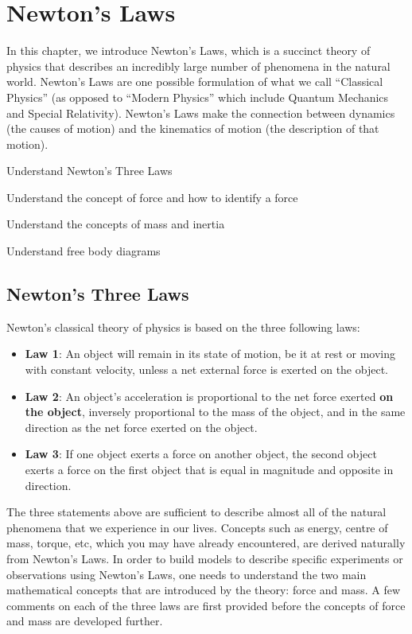 
\chapter{Newton's Laws}
In this chapter, we introduce Newton's Laws, which is a succinct theory of physics that describes an incredibly large number of phenomena in the natural world. Newton's Laws are one possible formulation of what we call ``Classical Physics'' (as opposed to ``Modern Physics'' which include Quantum Mechanics and Special Relativity). Newton's Laws make the connection between dynamics (the causes of motion) and the kinematics of motion (the description of that motion). 
\label{chap:NewtonsLaws}
 \vspace{1cm}
\begin{learningObjectives}
\item Understand Newton's Three Laws
\item Understand the concept of force and how to identify a force
\item Understand the concepts of mass and inertia
\item Understand free body diagrams
\end{learningObjectives}

\section{Newton's Three Laws}
Newton's classical theory of physics is based on the three following laws:
\begin{itemize}
\item \textbf{Law 1}: An object will remain in its state of motion, be it at rest or moving with constant velocity, unless a net external force is exerted on the object.
\item \textbf{Law 2}: An object's acceleration is proportional to the net force exerted \textbf{on the object}, inversely proportional to the mass of the object, and in the same direction as the net force exerted on the object.
\item \textbf{Law 3}: If one object exerts a force on another object, the second object exerts a force on the first object that is equal in magnitude and opposite in direction.
\end{itemize}
The three statements above are sufficient to describe almost all of the natural phenomena that we experience in our lives. Concepts such as energy, centre of mass, torque, etc, which you may have already encountered, are derived naturally from Newton's Laws. In order to build models to describe specific experiments or observations using Newton's Laws, one needs to understand the two main mathematical concepts that are introduced by the theory: force and mass. A few comments on each of the three laws are first provided before the concepts of force and mass are developed further.

